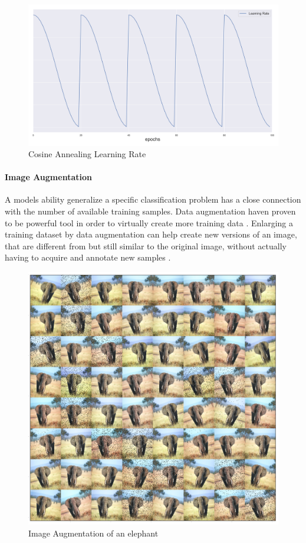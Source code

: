 \begin{figure}
	\centering
	\includegraphics[width=\linewidth]{figures/lr.png}
	\caption[Cosine Annealing Learning Rate]{Cosine Annealing Learning Rate} \label{fig:cosineannealing}
\end{figure}

\paragraph{Image Augmentation}

A models ability generalize a specific classification problem has a close connection with the number of available training samples. Data augmentation haven proven to be powerful tool in order to virtually create more training data \cite{perez_effectiveness_2017}. Enlarging a training dataset by data augmentation can help create new versions of an image, that are different from but still similar to the original image, without actually having to acquire and annotate new samples \cite{goodfellow_deep_2016}.  

\begin{figure}[H]
	\centering
	\includegraphics[width=\linewidth]{figures/augmentation/augmentation_high_resolution.png}
	\caption[Image Augmentaion Example]{Image Augmentation of an elephant}
	\label{fig:augmentation}
\end{figure}

